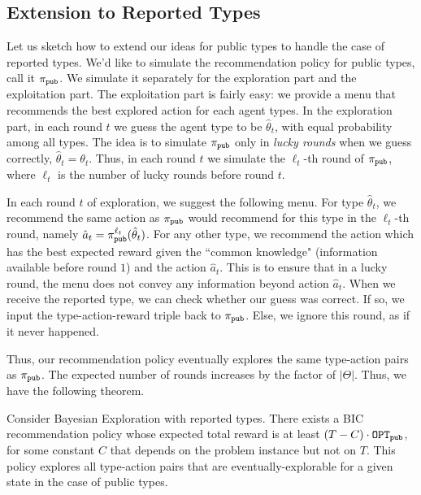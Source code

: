 
\subsection{Extension to Reported Types}
\label{sec:private_c}

\newcommand{\pipub}{\pi_{\term{pub}}}

Let us sketch how to extend our ideas for public types to handle the case of reported types. We'd like to simulate the recommendation policy for public types, call it $\pipub$. We simulate it separately for the exploration part and the exploitation part. The exploitation part is fairly easy: we provide a menu that recommends the best explored action for each agent types. In the exploration part, in each round $t$ we guess the agent type to be $\hat{\theta}_t$, with equal probability among all types. The idea is to simulate $\pipub$ only in \emph{lucky rounds} when we guess correctly, \ie $\hat{\theta}_t=\theta_t$. Thus, 
in each round $t$ we simulate the $\ell_t$-th round of $\pipub$, where $\ell_t$ is the number of lucky rounds before round $t$.

In each round $t$ of exploration, we suggest the following menu. For type $\hat{\theta}_t$, we recommend the same action as $\pipub$ would recommend for this type in the $\ell_t$-th round, namely 
    $\hat{a}_t = \pipub^{\ell_t}(\hat{\theta}_t)$.
For any other type, we recommend the action which has the best expected reward given the ``common knowledge" (information available before round $1$) and the action $\hat{a}_t$. This is to ensure that in a lucky round, the menu does not convey any information beyond action  $\hat{a}_t$. When we receive the reported type, we can check whether our guess was correct. If so, we input the type-action-reward triple back to $\pipub$. Else, we ignore this round, as if it never happened.

Thus, our recommendation policy eventually explores the same type-action pairs as $\pipub$. The expected number of rounds increases by the factor of $|\varTheta|$. Thus, we have the following theorem.

\begin{theorem}
\label{thm:reported}
Consider Bayesian Exploration with reported types.
There exists a BIC recommendation policy whose expected total reward is at least $\left(T - C \right) \cdot \mathtt{OPT}_{\mathtt{pub}}$, 
for some constant $C$ that depends on the problem instance but not on $T$.
This policy explores all type-action pairs that are eventually-explorable for a given state in the case of public types.
\end{theorem}

